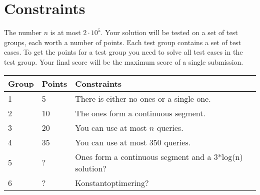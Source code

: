 \section*{Constraints}
The number $n$ is at most $2 \cdot 10^5$.
Your solution will be tested on a set of test groups, each worth a number of points.
Each test group contains a set of test cases.
To get the points for a test group you need to solve all test cases in the test group.
Your final score will be the maximum score of a single submission.

\noindent
\begin{tabular}{| l | l | l |}
\hline
Group & Points & Constraints \\ \hline
1     & 5     & There is either no ones or a single one. \\ \hline
2     & 10    & The ones form a continuous segment. \\ \hline
3     & 20    & You can use at most $n$ queries. \\ \hline
4     & 35    & You can use at most $350$ queries. \\ \hline
5     & ?     & Ones form a continuous segment and a 3*log(n) solution? \\ \hline
6     & ?     & Konstantoptimering?
\end{tabular}
